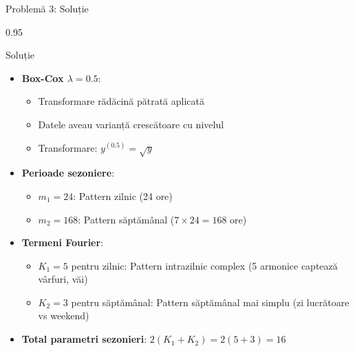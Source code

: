 \documentclass[9pt, aspectratio=169, t]{beamer}
\begin{document}
\begin{frame}{Problemă 3: Soluție}
    \begin{cminipage}{0.95\textwidth}
    \begin{exampleblock}{Soluție}
        \begin{itemize}\setlength{\itemsep}{0pt}
            \item \textbf{Box-Cox $\lambda = 0.5$}:
            \begin{itemize}\setlength{\itemsep}{0pt}
                \item Transformare rădăcină pătrată aplicată
                \item Datele aveau varianță crescătoare cu nivelul
                \item Transformare: $y^{(0.5)} = \sqrt{y}$
            \end{itemize}
            \item \textbf{Perioade sezoniere}:
            \begin{itemize}\setlength{\itemsep}{0pt}
                \item $m_1 = 24$: Pattern zilnic (24 ore)
                \item $m_2 = 168$: Pattern săptămânal ($7 \times 24 = 168$ ore)
            \end{itemize}
            \item \textbf{Termeni Fourier}:
            \begin{itemize}\setlength{\itemsep}{0pt}
                \item $K_1 = 5$ pentru zilnic: Pattern intrazilnic complex (5 armonice captează vârfuri, văi)
                \item $K_2 = 3$ pentru săptămânal: Pattern săptămânal mai simplu (zi lucrătoare vs weekend)
            \end{itemize}
            \item \textbf{Total parametri sezonieri}: $2(K_1 + K_2) = 2(5+3) = 16$
        \end{itemize}
    \end{exampleblock}
    \end{cminipage}
\end{frame}
\end{document}
